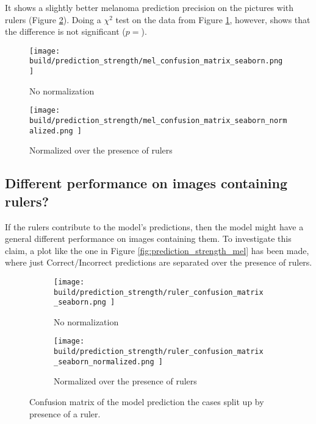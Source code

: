 It shows a slightly better melanoma prediction precision on the pictures with rulers (Figure \ref{fig:prediction_strength_mel_normalized}).
Doing a $\chi^2$ test on the data from Figure \ref{fig:prediction_strength_mel_not_normalized},
however, shows that the difference is not significant ($p=$).


\begin{center}
    \begin{subfigure}[h]{0.45\textwidth}
        \texttt{[image: 
            build/prediction\_strength/mel\_confusion\_matrix\_seaborn.png
        ]}
        \caption{No normalization}
        \label{fig:prediction_strength_mel_not_normalized}
    \end{subfigure}
    \begin{subfigure}[h]{0.45\textwidth}
        \texttt{[image: 
            build/prediction\_strength/mel\_confusion\_matrix\_seaborn\_normalized.png
        ]}
        \caption{Normalized over the presence of rulers}
        \label{fig:prediction_strength_mel_normalized}
    \end{subfigure}
    \label{fig:prediction_strength_mel}
\end{center}

\subsection{Different performance on images containing rulers?}
If the rulers contribute to the model's predictions,
then the model might have a general different performance on images containing them.
To investigate this claim, a plot like the one in Figure \ref{fig:prediction_strength_mel} has been made,
where just Correct/Incorrect predictions are separated over the presence of rulers.

\begin{figure}
    \centering
    \begin{subfigure}[h]{0.45\textwidth}
        \texttt{[image: 
            build/prediction\_strength/ruler\_confusion\_matrix\_seaborn.png
        ]}
        \caption{No normalization}
        \label{fig:prediction_strength_ruler_not_normalized}
    \end{subfigure}
    \begin{subfigure}[h]{0.45\textwidth}
        \texttt{[image: 
            build/prediction\_strength/ruler\_confusion\_matrix\_seaborn\_normalized.png
        ]}
        \caption{Normalized over the presence of rulers}
        \label{fig:prediction_strength_ruler_normalized}
    \end{subfigure}
    \caption{Confusion matrix of the model prediction the cases split up by presence of a ruler.}
    \label{fig:prediction_strength_ruler}
\end{figure}

